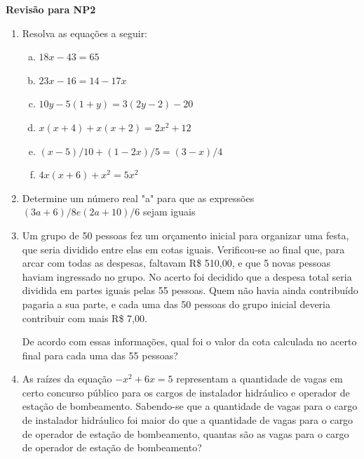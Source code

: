 \documentclass[12pt,onepage,a4paper]{memoir}
\newcommand{\tit}{Revisão para NP2}
\begin{document}
\thispagestyle{1pagina}
\vspace*{2.5cm} %

\vspace{0.5cm}
\textbf{\textsf{\large \tit}} %



\begin{enumerate} %
\item  Resolva as equações a seguir:

  \begin{enumerate} [a)]
  \item $18x - 43 = 65$
  \item $23x - 16 = 14 - 17x$
  \item $10y - 5 (1 + y) = 3 (2y - 2) - 20$
  \item $x(x + 4) + x(x + 2) = 2x^{2} + 12 $
  \item $(x - 5)/10 + (1 - 2x)/5 = (3-x)/4$
    \item $4x (x + 6) + x^{2} = 5x^{2}$
  \end{enumerate}

\item Determine um número real "a" para que as expressões $(3a + 6)/ 8 e (2a +
  10)/6$ sejam iguais

  \item Um grupo de 50 pessoas fez um orçamento inicial para organizar uma festa, que seria dividido entre elas em cotas iguais. Verificou-se ao final que, para arcar com todas as despesas, faltavam R\$ 510,00, e que 5 novas pessoas haviam ingressado no grupo. No acerto foi decidido que a despesa total seria dividida em partes iguais pelas 55 pessoas. Quem não havia ainda contribuído pagaria a sua parte, e cada uma das 50 pessoas do grupo inicial deveria contribuir com mais R\$ 7,00.

De acordo com essas informações, qual foi o valor da cota calculada no acerto
final para cada uma das 55 pessoas?

\item As raízes da equação $-x^{2} + 6x = 5$ representam a quantidade de vagas em certo concurso público para os cargos de instalador hidráulico e operador de estação de bombeamento. Sabendo-se que a quantidade de vagas para o cargo de instalador hidráulico foi maior do que a quantidade de vagas para o cargo de operador de estação de bombeamento, quantas são as vagas para o cargo de operador de estação de bombeamento?


\end{enumerate}
\end{document}
